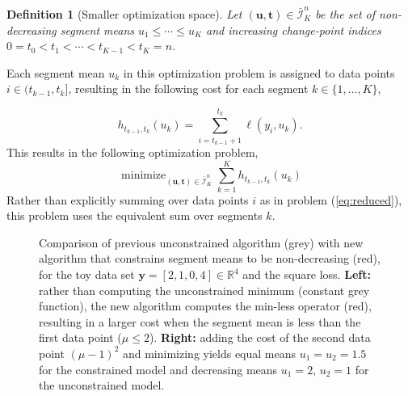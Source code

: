\documentclass{article}
\newtheorem{lemma}{Lemma}
\newtheorem{definition}{Definition}
\DeclareMathOperator*{\minimize}{minimize}
\newcommand{\RR}{\mathbb R}
\begin{document}
\begin{definition}[Smaller optimization space]
\label{def:Ibar}
  Let $(\mathbf u, \mathbf t)\in\bar{\mathcal I}^n_K$ be the set of
  non-decreasing segment means $u_1\leq\cdots\leq u_K$ and
  increasing change-point indices $0=t_0<t_1<\cdots<t_{K-1}<t_K=n$.
\end{definition}

Each segment mean $u_k$ in this optimization problem is assigned to
data points $i\in(t_{k-1},t_k]$, resulting in the following cost
for each segment $k\in\{1, \dots, K\}$,

\begin{equation}
  \label{eq:h}
  h_{t_{k-1}, t_k}(u_k) = \sum_{i=t_{k-1}+1}^{t_k} \ell(y_i, u_k).
\end{equation}
This results in the following optimization problem,
\begin{equation}
  \label{eq:isotonic_ut}
  \minimize_{(\mathbf u, \mathbf t)\in\bar{\mathcal I}^n_K}
  \sum_{k=1}^K
  h_{t_{k-1}, t_k}(u_k)
\end{equation}
Rather than explicitly summing over data points $i$ as in problem
(\ref{eq:reduced}), this problem uses the equivalent sum over segments $k$. 

\begin{figure}[b!]
  \centering
  
  
  \vskip -0.5cm
  \caption{Comparison of previous unconstrained algorithm (grey) with
    new algorithm that constrains segment means to be non-decreasing (red),
    for the toy data set $\mathbf y= [ 2, 1, 0, 4 ] \in\RR^4$ and the
    square loss. \textbf{Left:} rather than computing the
    unconstrained minimum (constant grey function), the new algorithm
    computes the min-less operator (red), resulting in a larger cost
    when the segment mean is less than the first data point
    ($\mu\leq 2$). \textbf{Right:} adding the cost of the second data
    point $(\mu-1)^2$ and minimizing yields equal means
    $u_1=u_2=1.5$ for the constrained model and decreasing 
    means $u_1=2,\, u_2=1$ for the unconstrained model.}
  \label{fig:compare-unconstrained}
\end{figure}


\end{document}
